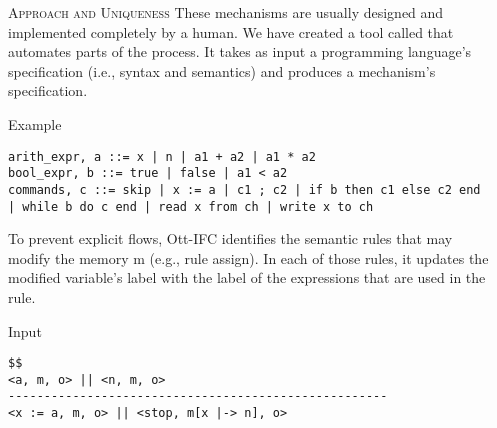 \documentclass[final]{beamer}
\newlength{\onecolwid}
\newlength{\twocolwid}
\begin{document}
\begin{frame}[fragile]
\begin{columns}[t]
\begin{column}{\onecolwid}
\end{column}
\begin{column}{\twocolwid}

\begin{block}{\textsc{Approach and Uniqueness}}
These mechanisms are usually designed and implemented completely by a human. We have created a tool called \emph{\ottifc} that automates parts of the process. It takes as input a programming language's specification (i.e., syntax and semantics) and produces a mechanism's specification. 

\begin{alertblock}{Example}
\begin{lstlisting}
arith_expr, a ::= x | n | a1 + a2 | a1 * a2                                    bool_expr, b ::= true | false | a1 < a2
commands, c ::= skip | x := a | c1 ; c2 | if b then c1 else c2 end | while b do c end | read x from ch | write x to ch  
\end{lstlisting}
\end{alertblock}      
\end{block}
\vspace{-1.5cm}
\color{black}
To prevent explicit flows, Ott-IFC identifies the semantic rules that may modify the memory m (e.g., rule assign). In each of those rules, it updates the modified variable's label with the label of the expressions that are used in the rule.
\noindent
\begin{minipage}[t]{0.48\linewidth}
\begin{alertblock}{Input}
\begin{lstlisting}
$$
<a, m, o> || <n, m, o>
-----------------------------------------------------
<x := a, m, o> || <stop, m[x |-> n], o>

\end{lstlisting}
\end{alertblock}
\end{minipage}
\end{column}
\end{columns}
\end{frame}
\end{document}
